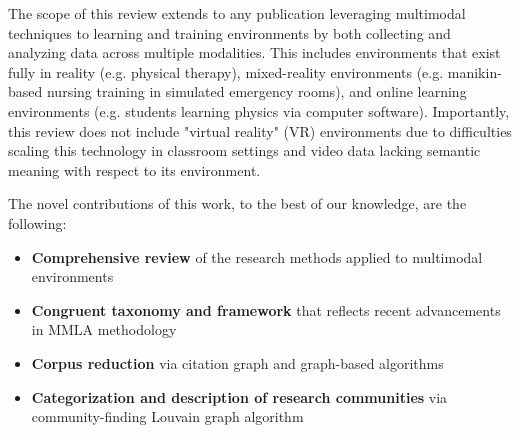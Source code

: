 \documentclass[manuscript,screen,review]{acmart}
\begin{document}
The scope of this review extends to any publication leveraging multimodal techniques to learning and training environments by both collecting and analyzing data across multiple modalities. This includes environments that exist fully in reality (e.g. physical therapy), mixed-reality environments (e.g. manikin-based nursing training in simulated emergency rooms), and online learning environments (e.g. students learning physics via computer software). Importantly, this review does not include "virtual reality" (VR) environments due to difficulties scaling this technology in classroom settings \cite{} and video data lacking semantic meaning with respect to its environment.

The novel contributions of this work, to the best of our knowledge, are the following: 
\begin{itemize}
    \item \textbf{Comprehensive review} of the research methods applied to multimodal environments
    \item \textbf{Congruent taxonomy and framework} that reflects recent advancements in MMLA methodology
    \item \textbf{Corpus reduction} via citation graph and graph-based algorithms
    \item \textbf{Categorization and description of research communities} via community-finding Louvain graph algorithm 
\end{itemize}

\end{document}
